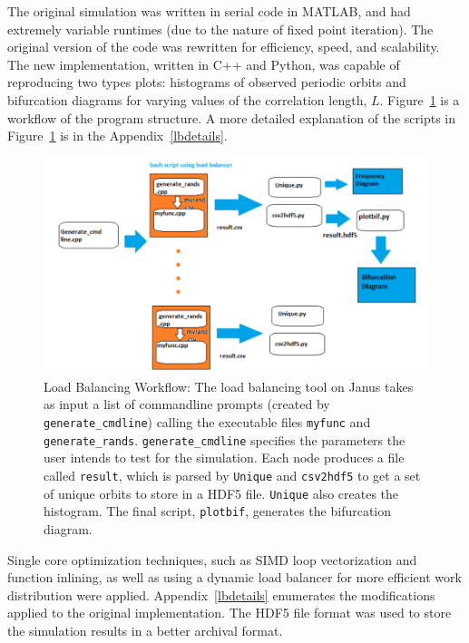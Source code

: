 The original simulation was written in serial code in
MATLAB, and had extremely variable runtimes (due to the nature of fixed
point iteration). The original version of the code was rewritten for efficiency,
speed, and scalability. The new implementation, written in C++ and
Python, was capable of reproducing two types plots: histograms of observed periodic
orbits and bifurcation diagrams for varying values of the correlation
length, $L$. Figure~\ref{fig:workflow} is a workflow of the
program structure. A more detailed explanation of the scripts in
Figure~\ref{fig:workflow} is in the Appendix~\ref{lbdetails}. 
\begin{figure}[H]\linespread{1}
\caption[Load Balancing Workflow]{Load Balancing Workflow: The load
  balancing tool on Janus takes as input a list of commandline prompts
  (created by \texttt{generate\_cmdline}) calling the
  executable files \texttt{myfunc} and
  \texttt{generate\_rands}. \texttt{generate\_cmdline}
  specifies the parameters the user intends to test for the
  simulation. Each node produces a file called \texttt{result},
  which is parsed by \texttt{Unique} and \texttt{csv2hdf5} to get
  a set of unique orbits to store in a HDF5 file. \texttt{Unique} also creates the histogram. The final script, \texttt{plotbif}, generates the bifurcation diagram.}\label{fig:workflow}
	\begin{center}
          \includegraphics[scale=0.5]{figs/workflow.png}
	\end{center}
\end{figure}

Single core optimization techniques, such as SIMD loop
vectorization and function inlining, as well as using a dynamic load
balancer for more efficient work distribution were
applied. Appendix~\ref{lbdetails} enumerates the modifications applied
to the original implementation. The HDF5
file format was used to store the simulation results in a better
archival format. 

